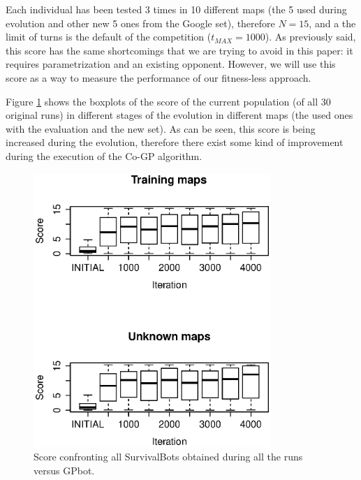 \documentclass[conference]{IEEEtran}
\begin{document}
Each individual has been tested 3 times in 10 different maps (the 5 used during evolution and other new 5 ones from the Google set), therefore $N=15$, and a the limit of turns is the default of the competition ($t_{MAX}=1000$). As previously said, this score has the same shortcomings that we are trying to avoid in this paper: it requires parametrization and an existing opponent. However, we will use this score as a way to measure the performance of our fitness-less approach.

Figure \ref{figura:Score_VS_GPBot} shows the boxplots of the score of the current population (of all 30 original runs) in different stages of the evolution in different maps (the used ones with the evaluation and the new set). As can be seen, this score is being increased during the evolution, therefore there exist some kind of improvement during the execution of the Co-GP algorithm.



\begin{figure}[htb]
\tiny
\begin{center}
\includegraphics[clip=true,width=9cm]{./imags/score_vs_gpbot.eps}
\end{center}
\caption{Score confronting all SurvivalBots obtained during all the runs versus GPbot.}
\label{figura:Score_VS_GPBot}
\end{figure}
\end{document}

